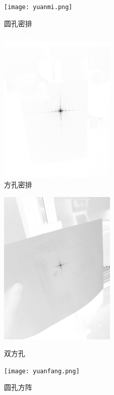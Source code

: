 \documentclass{ctexart}
\begin{document}
\begin{figure}
\begin{minipage}[t]{0.5\linewidth}
        \centering  
        \texttt{[image: yuanmi.png]}  
        \caption{圆孔密排}  
        \label{fig:side:a}  
        \end{minipage}%
        \begin{minipage}[t]{0.5\linewidth}  
        \centering  
        \includegraphics[width=2.2in]{fangmi.png}  
        \caption{方孔密排}  
        \label{fig:side:b}  
        \end{minipage}  
        \end{figure}  \begin{figure}  
          \begin{minipage}[t]{0.5\linewidth}  
          \centering  
          \includegraphics[width=2.2in]{shuangfang.png}  
          \caption{双方孔}  
          \label{fig:side:a}  
          \end{minipage}%
          \begin{minipage}[t]{0.5\linewidth}  
          \centering  
          \texttt{[image: yuanfang.png]}  
          \caption{圆孔方阵}  
          \label{fig:side:b}  
          \end{minipage}  
          \end{figure}  
\end{document}
